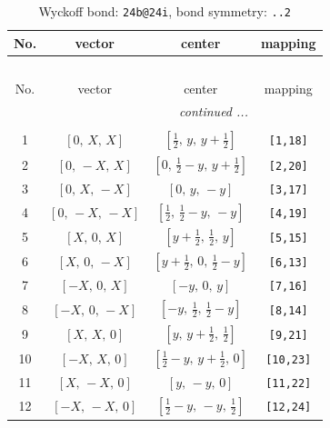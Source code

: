 \documentclass[fleqn,8pt]{jsarticle}
\begin{document}
\begin{longtable}{cccc}
\caption{Wyckoff bond: {\tt 24b@24i}, bond symmetry: {\tt ..2}}
 \\
 \hline \hline
No. & vector & center & mapping \\ \hline \endfirsthead

\multicolumn{3}{l}{\tablename\ \thetable{}} \\
 \hline \hline
No. & vector & center & mapping \\ \hline \endhead

 \hline \hline
\multicolumn{3}{r}{\footnotesize\it continued ...} \\ \endfoot

 \hline \hline
\multicolumn{3}{r}{} \\ \endlastfoot

1 & $\left[ 0,\, X,\, X \right]$ & $\left[ \frac{1}{2},\, y,\, y + \frac{1}{2} \right]$ & {\tt [1,18]} \\ \hline
2 & $\left[ 0,\, - X,\, X \right]$ & $\left[ 0,\, \frac{1}{2} - y,\, y + \frac{1}{2} \right]$ & {\tt [2,20]} \\ \hline
3 & $\left[ 0,\, X,\, - X \right]$ & $\left[ 0,\, y,\, - y \right]$ & {\tt [3,17]} \\ \hline
4 & $\left[ 0,\, - X,\, - X \right]$ & $\left[ \frac{1}{2},\, \frac{1}{2} - y,\, - y \right]$ & {\tt [4,19]} \\ \hline
5 & $\left[ X,\, 0,\, X \right]$ & $\left[ y + \frac{1}{2},\, \frac{1}{2},\, y \right]$ & {\tt [5,15]} \\ \hline
6 & $\left[ X,\, 0,\, - X \right]$ & $\left[ y + \frac{1}{2},\, 0,\, \frac{1}{2} - y \right]$ & {\tt [6,13]} \\ \hline
7 & $\left[ - X,\, 0,\, X \right]$ & $\left[ - y,\, 0,\, y \right]$ & {\tt [7,16]} \\ \hline
8 & $\left[ - X,\, 0,\, - X \right]$ & $\left[ - y,\, \frac{1}{2},\, \frac{1}{2} - y \right]$ & {\tt [8,14]} \\ \hline
9 & $\left[ X,\, X,\, 0 \right]$ & $\left[ y,\, y + \frac{1}{2},\, \frac{1}{2} \right]$ & {\tt [9,21]} \\ \hline
10 & $\left[ - X,\, X,\, 0 \right]$ & $\left[ \frac{1}{2} - y,\, y + \frac{1}{2},\, 0 \right]$ & {\tt [10,23]} \\ \hline
11 & $\left[ X,\, - X,\, 0 \right]$ & $\left[ y,\, - y,\, 0 \right]$ & {\tt [11,22]} \\ \hline
12 & $\left[ - X,\, - X,\, 0 \right]$ & $\left[ \frac{1}{2} - y,\, - y,\, \frac{1}{2} \right]$ & {\tt [12,24]} \\ \hline

\end{longtable}
\end{document}
